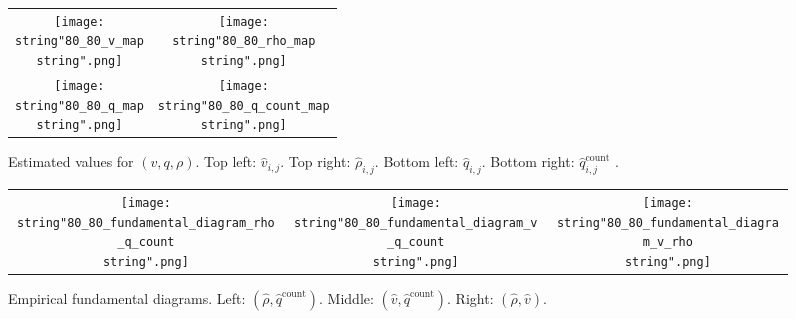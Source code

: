 \documentclass[preprint]{elsarticle}
\begin{document}
\begin{figure}[H]
\centering
\begin{tabular}{cc}
\texttt{[image: \\string"80\_80\_v\_map\\string".png]} & \texttt{[image: \\string"80\_80\_rho\_map\\string".png]}\tabularnewline
\texttt{[image: \\string"80\_80\_q\_map\\string".png]} & \texttt{[image: \\string"80\_80\_q\_count\_map\\string".png]}\tabularnewline
\end{tabular}
\protect\caption{Estimated values for $\left(v,q,\rho\right)$. Top left: $\widehat{v}_{i,j}$.
Top right: $\widehat{\rho}_{i,j}$. Bottom left: $\widehat{q}_{i,j}$.
Bottom right: $\widehat{q}_{i,j}^{\text{count}}$ .\label{fig:Estimated-values}}
\end{figure}

\begin{figure}[H]
\centering
\begin{tabular}{ccc}
\texttt{[image: \\string"80\_80\_fundamental\_diagram\_rho\_q\_count\\string".png]} & \texttt{[image: \\string"80\_80\_fundamental\_diagram\_v\_q\_count\\string".png]} & \texttt{[image: \\string"80\_80\_fundamental\_diagram\_v\_rho\\string".png]}\tabularnewline
\end{tabular}
\protect\caption{Empirical fundamental diagrams. Left: $\left(\widehat{\rho},\widehat{q}^{\text{count}}\right)$.
Middle: $\left(\widehat{v},\widehat{q}^{\text{count}}\right)$. Right: $\left(\widehat{\rho},\widehat{v}\right)$.
\label{fig:Empirical-fundamental-diagrams}}
\end{figure}
\end{document}
